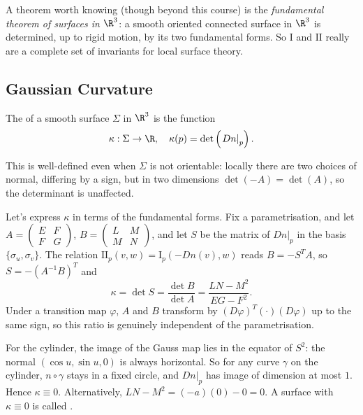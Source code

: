 \begin{remark}
    A theorem worth knowing (though beyond this course) is the \emph{fundamental theorem of surfaces in $\R^3$}: a smooth oriented connected surface in $\R^3$ is determined, up to rigid motion, by its two fundamental forms. So $\mathrm{I}$ and $\mathrm{II}$ really are a complete set of invariants for local surface theory.
\end{remark}

\subsection{Gaussian Curvature}

\begin{definition}
    The  of a smooth surface $\Sigma$ in $\R^3$ is the function
    $$
    \kappa : \Sigma \rightarrow \R, \quad \kappa(p) = \det\left(\left.Dn\right|_p\right).
    $$
\end{definition}

\begin{remark}
    This is well-defined even when $\Sigma$ is not orientable: locally there are two choices of normal, differing by a sign, but in two dimensions $\det(-A) = \det(A)$, so the determinant is unaffected.
\end{remark}

Let's express $\kappa$ in terms of the fundamental forms. Fix a parametrisation, and let $A = \begin{pmatrix} E & F \\ F & G\end{pmatrix}$, $B = \begin{pmatrix} L & M \\ M & N \end{pmatrix}$, and let $S$ be the matrix of $\left.Dn\right|_p$ in the basis $\{\sigma_u, \sigma_v\}$. The relation $\mathrm{II}_p(v, w) = \mathrm{I}_p(-Dn(v), w)$ reads $B = -S^T A$, so $S = -(A^{-1}B)^T$ and
$$
\kappa = \det S = \frac{\det B}{\det A} = \frac{LN - M^2}{EG - F^2}.
$$
Under a transition map $\varphi$, $A$ and $B$ transform by $(D\varphi)^T(\cdot)(D\varphi)$ up to the same sign, so this ratio is genuinely independent of the parametrisation.

\begin{example}
    For the cylinder, the image of the Gauss map lies in the equator of $S^2$: the normal $(\cos u, \sin u, 0)$ is always horizontal. So for any curve $\gamma$ on the cylinder, $n \circ \gamma$ stays in a fixed circle, and $\left.Dn\right|_p$ has image of dimension at most $1$. Hence $\kappa \equiv 0$. Alternatively, $LN - M^2 = (-a)(0) - 0 = 0$. A surface with $\kappa \equiv 0$ is called .
\end{example}

